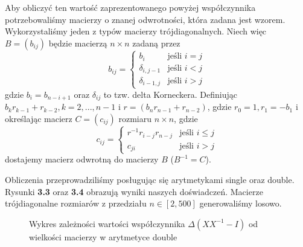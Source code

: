 Aby obliczyć ten wartość zaprezentowanego powyżej współczynnika potrzebowaliśmy macierzy o znanej odwrotności, która zadana jest wzorem. Wykorzystaliśmy jeden z typów macierzy trójdiagonalnych. Niech więc $B = (b_{ij})$ będzie macierzą $n \times n$ zadaną przez
$$b_{ij} = \left\{\begin{matrix}b_i & \mbox{jeśli } i=j \\\delta_{i, j-1} & \mbox{jeśli } i<j \\\delta_{i-1,j} & \mbox{jeśli } i>j \end{matrix}\right.$$
gdzie $b_i=b_{n-i+1}$ oraz $\delta_{ij}$ to tzw. delta Korneckera. Definiując
$b_kr_{k-1}+r_{k-2}, k = 2, ... , n-1$ i $r=(b_nr_{n-1}+r_{n-2})$, gdzie
$r_0=1, r_1=-b_1$ i określając macierz $C=(c_{ij})$ rozmiaru $n \times n$, gdzie
$$c_{ij} = \left\{\begin{matrix}r^{-1}r_{i-j}r_{n-j} & \mbox{jeśli } i \leq j  \\c_{ji} & \mbox{jeśli } i > j \end{matrix}\right.$$
dostajemy macierz odwrotną do macierzy $B$ ($B^{-1}=C$).

Obliczenia przeprowadziliśmy posługując się arytmetykami single oraz double. Rysunki \textbf{3.3} oraz \textbf{3.4} obrazują wyniki naszych doświadczeń. Macierze trójdiagonalne rozmiarów z przedziału $n \in [2,500]$  generowaliśmy losowo. 
\begin{figure}[h!tb]
\begin{center}

\caption{Wykres zależności wartości współczynnika $\Delta(XX^{-1}-I)$ od wielkości macierzy w arytmetyce double}
\end{center}
\end{figure}

